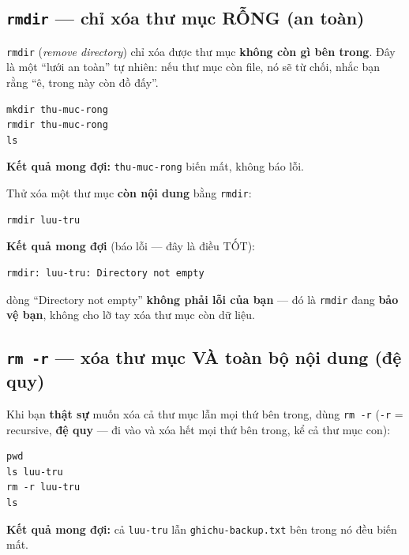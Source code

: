 \documentclass[12pt,a4paper]{article}
\newcommand{\cmd}[1]{\texttt{#1}}
\begin{document}
\subsection{\texttt{rmdir} --- chỉ xóa thư mục RỖNG (an toàn)}

\cmd{rmdir} (\textit{remove directory}) chỉ xóa được thư mục \textbf{không còn gì bên trong}. Đây là một ``lưới an toàn'' tự nhiên: nếu thư mục còn file, nó sẽ từ chối, nhắc bạn rằng ``ê, trong này còn đồ đấy''.

\begin{Verbatim}
mkdir thu-muc-rong
rmdir thu-muc-rong
ls
\end{Verbatim}

\textbf{Kết quả mong đợi:} \cmd{thu-muc-rong} biến mất, không báo lỗi.

Thử xóa một thư mục \textbf{còn nội dung} bằng \cmd{rmdir}:

\begin{Verbatim}
rmdir luu-tru
\end{Verbatim}

\textbf{Kết quả mong đợi} (báo lỗi --- đây là điều TỐT):
\begin{Verbatim}
rmdir: luu-tru: Directory not empty
\end{Verbatim}

\begin{notebox}[title={Trấn an}]
dòng ``Directory not empty'' \textbf{không phải lỗi của bạn} --- đó là \cmd{rmdir} đang \textbf{bảo vệ bạn}, không cho lỡ tay xóa thư mục còn dữ liệu.
\end{notebox}

\subsection{\texttt{rm -r} --- xóa thư mục VÀ toàn bộ nội dung (đệ quy)}

Khi bạn \textbf{thật sự} muốn xóa cả thư mục lẫn mọi thứ bên trong, dùng \cmd{rm -r} (\cmd{-r} = recursive, \textbf{đệ quy} --- đi vào và xóa hết mọi thứ bên trong, kể cả thư mục con):

\begin{Verbatim}
pwd
ls luu-tru
rm -r luu-tru
ls
\end{Verbatim}

\textbf{Kết quả mong đợi:} cả \cmd{luu-tru} lẫn \cmd{ghichu-backup.txt} bên trong nó đều biến mất.
\end{document}
